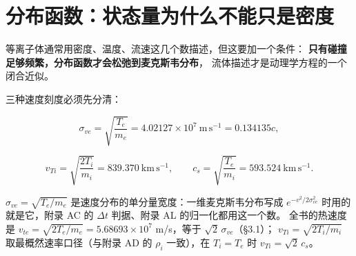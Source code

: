 %

\section{分布函数：状态量为什么不能只是密度}
\label{sec:app-ae-distribution}

等离子体通常用密度、温度、流速这几个数描述，但这要加一个条件：
\textbf{只有碰撞足够频繁，分布函数才会松弛到麦克斯韦分布}，
流体描述才是动理学方程的一个闭合近似。

三种速度刻度必须先分清：

\begin{equation}
\sigma_{ve}=\sqrt{\frac{T_e}{m_e}}=4.02127\times10^{7}\ \mathrm{m\,s^{-1}}=0.134135c ,
\label{eq:app-ae-vthe}
\end{equation}

\begin{equation}
v_{Ti}=\sqrt{\frac{2T_i}{m_i}}=839.370\ \mathrm{km\,s^{-1}},\qquad
c_s=\sqrt{\frac{T_e}{m_i}}=593.524\ \mathrm{km\,s^{-1}} .
\label{eq:app-ae-vthe2}
\end{equation}

$\sigma_{ve}=\sqrt{T_e/m_e}$ 是速度分布的单分量宽度：一维麦克斯韦分布写成
$e^{-v^2/2\sigma_{ve}^2}$ 时用的就是它，附录 AC 的 $\Delta t$ 判据、附录 AL 的归一化都用这一个数。
全书的热速度是 $v_{te}=\sqrt{2T_e/m_e}=5.68693\times10^{7}$ m/s，等于 $\sqrt2\,\sigma_{ve}$（\S 3.1）；
$v_{Ti}=\sqrt{2T_i/m_i}$ 取最概然速率口径（与附录 AD 的 $\rho_i$ 一致），在 $T_i=T_e$ 时 $v_{Ti}=\sqrt2\,c_s$。

